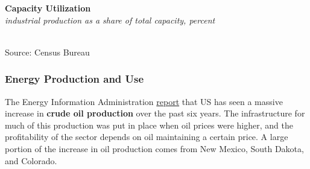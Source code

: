 \documentclass{report}
\makeatletter
\newcommand{\tbllink}[1]{\href{https://raw.githubusercontent.com/bdecon/US-chartbook/master/chartbook/data/#1}{\faTable}}
\newcommand*\short[1]{\expandafter\@gobbletwo\number\numexpr#1\relax}
\newcommand{\stdnode}[3]{\node[below, align=left, shift=({#1,#2})]{#3};}
\newcommand{\dateaxisticks}{
		date coordinates in=x, axis line style={draw=none},
		xmax={2021-06-15},
		max space between ticks=40,	    
		xtick={{1990-01-01}, {1992-01-01}, {1994-01-01}, 
			{1996-01-01}, {1998-01-01}, {2000-01-01}, 
			{2002-01-01}, {2004-01-01}, {2006-01-01},
			{2008-01-01}, {2010-01-01}, {2012-01-01}, {2014-01-01},
		    {2016-01-01}, {2018-01-01}, {2020-01-01}},
		minor xtick={{1989-01-01}, {1991-01-01}, {1993-01-01},
			{1995-01-01}, {1997-01-01}, {1999-01-01}, 
			{2001-01-01}, {2003-01-01}, {2005-01-01}, {2007-01-01},
		    {2009-01-01}, {2011-01-01}, {2013-01-01}, {2015-01-01},
		    {2017-01-01}, {2019-01-01}, {2021-01-01}},
		enlarge y limits={0.06}, enlarge x limits={0.01},
		}
\newcommand{\bbar}[2]{extra #1 ticks = {{#2}}, extra #1 tick labels = ,
		extra #1 tick style = {grid=major, grid style={thick, black!25}},}
\newcommand{\stdline}[4]{\addplot[very thick, no markers, color=#1] 
		table [x=#2, y=#3, col sep=comma] {#4};	}
\newcommand{\thinline}[4]{\addplot[no markers, color=#1] 
		table [x=#2, y=#3, col sep=comma] {#4};	}
\newcommand{\rbars}{
		\fill[color=black!10] (axis cs:{1990-07-01},\pgfkeysvalueof{/pgfplots/ymin}) rectangle 
			(axis cs:{1991-03-01}, \pgfkeysvalueof{/pgfplots/ymax});
		\fill[color=black!10] (axis cs:{2007-12-01},\pgfkeysvalueof{/pgfplots/ymin}) rectangle 
			(axis cs:{2009-07-01}, \pgfkeysvalueof{/pgfplots/ymax});
		\fill[color=black!10] (axis cs:{2001-03-01},\pgfkeysvalueof{/pgfplots/ymin}) rectangle 
			(axis cs:{2001-11-01}, \pgfkeysvalueof{/pgfplots/ymax});
		\fill[color=black!10] (axis cs:{2020-02-01},\pgfkeysvalueof{/pgfplots/ymin}) rectangle 
			(axis cs:{2021-06-15}, \pgfkeysvalueof{/pgfplots/ymax});}
\makeatother
\begin{document}
{\begin{minipage}{0.76\textwidth}
\normalsize \textbf{Capacity Utilization}\\
\footnotesize{\textit{industrial production as a share of total capacity, percent}}\\
\hspace*{-2mm} \\
\footnotesize{Source: Census Bureau} \hfill \tbllink{tcu.csv}
\end{minipage}
\newpage
\subsubsection*{\color{black!70} \seriffont Energy Production and Use}
\begin{minipage}{0.76\textwidth}
\small The Energy Information Administration \href{https://www.eia.gov/dnav/pet/pet_crd_crpdn_adc_mbblpd_m.htm}{report} that US has seen a massive increase in \textbf{crude oil production} over the past six years. The infrastructure for much of this production was put in place when oil prices were higher, and the profitability of the sector depends on oil maintaining a certain price. A large portion of the increase in oil production comes from New Mexico, South Dakota, and Colorado. 
\vspace{2mm}


\end{minipage}}
\end{document}
